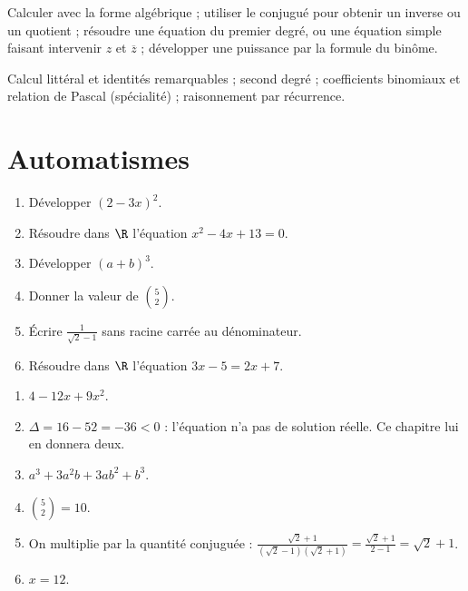 
\begin{objectives}
Calculer avec la forme algébrique ; utiliser le conjugué pour obtenir un inverse ou un quotient ; résoudre une équation du premier degré, ou une équation simple faisant intervenir $z$ et $\overline{z}$ ; développer une puissance par la formule du binôme.
\end{objectives}
\begin{prerequisites}
Calcul littéral et identités remarquables ; second degré ; coefficients binomiaux et relation de Pascal (spécialité) ; raisonnement par récurrence.
\end{prerequisites}

\section{Automatismes}
\begin{fluency}
\begin{enumerate}
\item Développer $(2-3x)^2$.
\item Résoudre dans $\R$ l'équation $x^2-4x+13=0$.
\item Développer $(a+b)^3$.
\item Donner la valeur de $\binom{5}{2}$.
\item Écrire $\frac{1}{\sqrt2-1}$ sans racine carrée au dénominateur.
\item Résoudre dans $\R$ l'équation $3x-5=2x+7$.
\end{enumerate}
\end{fluency}
\begin{solution}[Automatismes]
\begin{enumerate}
\item $4-12x+9x^2$.
\item $\Delta=16-52=-36<0$ : l'équation n'a pas de solution réelle. Ce chapitre lui en donnera deux.
\item $a^3+3a^2b+3ab^2+b^3$.
\item $\binom{5}{2}=10$.
\item On multiplie par la quantité conjuguée : $\frac{\sqrt2+1}{(\sqrt2-1)(\sqrt2+1)}=\frac{\sqrt2+1}{2-1}=\sqrt2+1$.
\item $x=12$.
\end{enumerate}
\end{solution}

